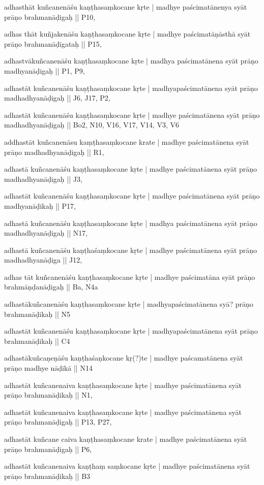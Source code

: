 \begin{ekdosis}
\begin{marma}[hp01_055]
\begin{marma}[hp02_009]
\begin{marma}[hp02_011]
\begin{marma}[hp02_46]
\item[adhasthāt kuñcanenāśu kaṇṭhasaṃkocane kṛte | madhye paścimatānenya syāt prāṇo brahmanāḍigaḥ ||] P10,
\item[adhas thāt kuñjakenāśu kaṇṭhasaṃkocane kṛte | madhye paścimatāṇāsthā syāt prāṇo brahmanāḍīgataḥ ||] P15, 
\item[adhastvākuñcanenāśu kaṇṭhasaṃkocane kṛte | madhya paścimatānena syāt prāṇo madhyanāḍigaḥ ||] P1, P9, 
\item[adhastāt kuñcanenāśu kaṇṭhasaṃkocane kṛte | madhyapaścimatānena syāt prāṇo madhadhyanāḍigaḥ ||] J6, J17, P2,
\item[adhastāt kuñcanenāśu kaṇṭhasaṃkocane kṛte | madhye paścimatānena syāt prāṇo madhadhyanāḍigaḥ ||] Bo2, N10, V16, V17, V14, V3, V6
\item[addhastāt kuñcanenāsu kaṃṭhasaṃkocane krate | madhye paścimatānena syāt prāṇo madhadhyanāḍigaḥ ||] R1, 
\item[adhastā kuñcanenāśu kaṇṭhasaṃkocane kṛte | madhye paścimatānena syāt prāṇo madhadhyanāḍigaḥ ||] J3,
\item[adhastāt kuñcanenāśu kaṇṭhasaṃkocane kṛte | madhye paścimatānena syāt prāṇo madhyanāḍikaḥ ||] P17, 
\item[adhastā kuñcanenāśu kaṇṭhasaṃkocane kṛte | madhya paścimatānena syāt prāṇo madhadhyanāḍigaḥ ||] N17,
\item[adhastā kuñcanenāśu kaṇṭhaśaṃkocane kṛte | madhye paścimatānena syāt prāṇo madhadhyanāḍiga ||] J12,
\item[adhas tāt kuñcanenāśu kaṇṭhasaṃkocane kṛte | madhye paścimatāna syāt prāṇo brahmāṇḍanāḍigaḥ ||]  Ba, N4a
\item[adhastākuñcanenāśu kaṇṭhasaṃkocane kṛte | madhyapaścimatānena syā? prāṇo brahmanāḍikaḥ ||]  N5
\item[adhastāt kuñcanenāśu kaṇṭhasaṃkocane kṛte | madhyapaścimatānena syāt prāṇo brahmanāḍikaḥ ||] C4
\item[adhastākuñcaṇeṇāśu kaṇṭhaśaṇkocane kṛ(?)te | madhye paścamatānena syāt prāṇo madhye nāḍikā ||] N14
\item[adhastāt kuñcanenaiva kaṇṭhasaṃkocane kṛte | madhye paścimatānena syāt prāṇo brahmanāḍikaḥ ||] N1,
\item[adhastāt kuñcanenaiva kaṇṭhasaṃkocane kṛte | madhye paścimatānena syāt prāṇo brahmanāḍigaḥ ||] P13, P27, 
\item[adhastāt kuñcane caiva kaṇṭhasaṃkocane krate | madhye paścimatānena syāt prāṇo brahmanāḍigaḥ ||] P6,
\item[adhastāt kuñcanenaiva kaṇṭhaṃ saṃkocane kṛte | madhye paścimatānena syāt prāṇo brahmanāḍikaḥ ||] B3

\end{marma}
\end{marma}
\end{marma}
\end{marma}
\end{ekdosis}
